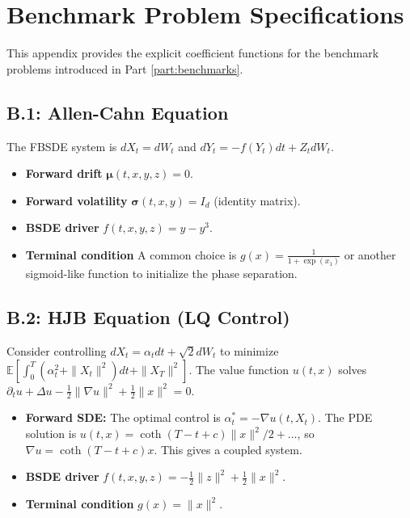 \section{Benchmark Problem Specifications}
\label{app:benchmark_details}

This appendix provides the explicit coefficient functions for the benchmark problems introduced in Part \ref{part:benchmarks}.

\subsection{B.1: Allen-Cahn Equation}
The FBSDE system is \(dX_t = dW_t\) and \(dY_t = -f(Y_t)dt + Z_t dW_t\).
\begin{itemize}
    \item \textbf{Forward drift} \(\bm\mu(t,x,y,z) = 0\).
    \item \textbf{Forward volatility} \(\bm\sigma(t,x,y) = I_d\) (identity matrix).
    \item \textbf{BSDE driver} \(f(t,x,y,z) = y - y^3\).
    \item \textbf{Terminal condition} A common choice is \(g(x) = \frac{1}{1+\exp(x_1)}\) or another sigmoid-like function to initialize the phase separation.
\end{itemize}

\subsection{B.2: HJB Equation (LQ Control)}
Consider controlling \(dX_t = \alpha_t dt + \sqrt{2}dW_t\) to minimize \(\mathbb{E}[\int_0^T (\alpha_t^2 + \|X_t\|^2) dt + \|X_T\|^2]\). The value function \(u(t,x)\) solves \(\partial_t u + \Delta u - \frac{1}{2} \|\nabla u\|^2 + \frac{1}{2}\|x\|^2 = 0\).
\begin{itemize}
    \item \textbf{Forward SDE:} The optimal control is \(\alpha_t^* = -\nabla u(t,X_t)\). The PDE solution is \(u(t,x) = \coth(T-t+c)\|x\|^2/2 + \dots\), so \(\nabla u = \coth(T-t+c)x\). This gives a coupled system.
    \item \textbf{BSDE driver} \(f(t,x,y,z) = -\frac{1}{2}\|z\|^2 + \frac{1}{2}\|x\|^2\).
    \item \textbf{Terminal condition} \(g(x) = \|x\|^2\).
\end{itemize}

